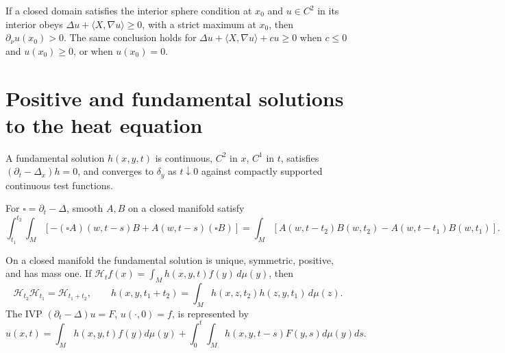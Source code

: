 \begin{theorem}
\label{thm:chow-ii-hopf-boundary-point}

If a closed domain satisfies the interior sphere condition at $x_0$ and
$u\in C^2$ in its interior obeys $\Delta u+\langle X,\nabla u\rangle\ge0$,
with a strict maximum at $x_0$, then $\partial_\nu u(x_0)>0$.  The same
conclusion holds for $\Delta u+\langle X,\nabla u\rangle+cu\ge0$ when
$c\le0$ and $u(x_0)\ge0$, or when $u(x_0)=0$.
\end{theorem}

\section{Positive and fundamental solutions to the heat equation}

\begin{definition}
\label{def:chow-ii-heat-fundamental-solution}

A fundamental solution $h(x,y,t)$ is continuous, $C^2$ in $x$, $C^1$ in $t$,
satisfies $(\partial_t-\Delta_x)h=0$, and converges to $\delta_y$ as
$t\downarrow0$ against compactly supported continuous test functions.
\end{definition}

\begin{lemma}
\label{lem:chow-ii-duhamel-closed}

For $\square=\partial_t-\Delta$, smooth $A,B$ on a closed manifold satisfy
\[
\int_{t_1}^{t_2}\!\int_M[-(\square A)(w,t-s)B+A(w,t-s)(\square B)]
=\int_M[A(w,t-t_2)B(w,t_2)-A(w,t-t_1)B(w,t_1)].
\]
\end{lemma}

\begin{theorem}
\label{thm:chow-ii-closed-heat-kernel}


On a closed manifold the fundamental solution is unique, symmetric, positive,
and has mass one.  If $\mathscr H_t f(x)=\int_M h(x,y,t)f(y)\,d\mu(y)$, then
\[
\mathscr H_{t_2}\mathscr H_{t_1}=\mathscr H_{t_1+t_2},\qquad
h(x,y,t_1+t_2)=\int_M h(x,z,t_2)h(z,y,t_1)\,d\mu(z).
\]
The IVP $(\partial_t-\Delta)u=F$, $u(\cdot,0)=f$, is represented by
\[
u(x,t)=\int_Mh(x,y,t)f(y)d\mu(y)+\int_0^t\!\int_Mh(x,y,t-s)F(y,s)d\mu(y)ds.
\]
\end{theorem}

